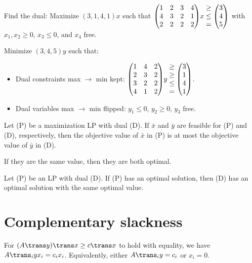 \begin{example}
  Find the dual: Maximize $(3,1,4,1)x$ such that
  $\mqty(1&2&3&4\\4&3&2&1\\2&2&2&2)x\mathrel{\mqty{\geq\\\leq\\=}}\mqty(3\\4\\5)$
  with $x_1, x_2 \geq 0$, $x_3 \leq 0$, and $x_4$ free.
\end{example}
\begin{sol}
  Minimize $(3,4,5)y$ such that:
  \begin{itemize}[nosep]
    \item Dual constraints max $\to$ min kept:
          $\mqty(1&4&2\\2&3&2\\3&2&2\\4&1&2)y\mathrel{\mqty{\geq\\\geq\\\leq\\=}}\mqty(3\\1\\4\\1)$.
    \item Dual variables max $\to$ min flipped: $y_1 \leq 0$, $y_2 \geq 0$, $y_3$ free.
  \end{itemize}
\end{sol}

\begin{theorem}
  Let (P) be a maximization LP with dual (D).
  If $\bar x$ and $\bar y$ are feasible for (P) and (D),
  respectively, then the objective value of $\bar x$ in (P)
  is at most the objective value of $\bar y$ in (D).

  If they are the same value, then they are both optimal.
\end{theorem}

\begin{theorem}
  Let (P) be an LP with dual (D).
  If (P) has an optimal solution,
  then (D) has an optimal solution with the same optimal value.
\end{theorem}

\section{Complementary slackness}

\begin{defn}
  For $(A\trans y)\trans x \geq c\trans x$ to hold with equality,
  we have $A\trans_i y x_i = c_i x_i$.
  Equivalently, either $A\trans_i y = c_i$ or $x_i = 0$.
\end{defn}

